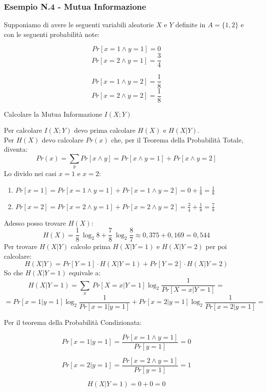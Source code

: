 \newpage

\subsubsection{Esempio N.4 - Mutua Informazione}
Supponiamo di avere le seguenti variabili aleatorie $X$ e $Y$ definite in $A=\{1, 2\}$ e con le seguenti probabilità note:\\
\begin{minipage}{0.50\textwidth}
	\begin{center}
		$$
		Pr[x=1 \wedge y=1] = 0
		$$
		$$
		Pr[x=2 \wedge y=1] = \frac{3}{4}
		$$
	\end{center}
\end{minipage}
\begin{minipage}{0.50\textwidth}
	\begin{center}
		$$
		Pr[x=1 \wedge y=2] = \frac{1}{8}
		$$
		$$
		Pr[x=2 \wedge y=2] = \frac{1}{8}
		$$
	\end{center}
\end{minipage}

Calcolare la Mutua Informazione $I(X;Y)$

Per calcolare $I(X;Y)$ devo prima calcolare $H(X)$ e $H(X|Y)$.\\ Per $H(X)$ devo calcolare $Pr(x)$ che, per il Teorema della Probabilità Totale, diventa:
$$
Pr(x) = \sum_{y} Pr[x \wedge y] = Pr[x \wedge y=1] + Pr[x \wedge y=2]
$$
Lo divido nei casi $x=1$ e $x=2$:
\begin{enumerate}
	\item $Pr[x=1] = Pr[x=1 \wedge y=1] + Pr[x=1 \wedge y=2] = 0 + \frac{1}{8} = \frac{1}{8}$
	\item $Pr[x=2] = Pr[x=2 \wedge y=1] + Pr[x=2 \wedge y=2] = 
	\frac{3}{4} + \frac{1}{8} = \frac{7}{8}$
\end{enumerate}

Adesso posso trovare $H(X)$:
$$
H(X) = \frac{1}{8}\ \log_{2}8 + \frac{7}{8}\ \log_{2} \frac{8}{7} \approx 0,375 + 0,169 = 0,544
$$
Per trovare $H(X|Y)$ calcolo prima $H(X|Y=1)$ e $H(X|Y=2)$ per poi calcolare:
$$
H(X|Y) = Pr[Y=1]\cdot H(X|Y=1) + Pr[Y=2]\cdot H(X|Y=2)
$$
So che $H(X|Y=1)$ equivale a:
$$
H(X|Y=1) = \sum_{x}\ Pr[X=x|Y=1] \log_{2} \frac{1}{Pr[X=x|Y=1]} = 
$$
$$
= Pr[x=1|y=1] \log_{2} \frac{1}{Pr[x=1|y=1]} + Pr[x=2|y=1] \log_{2} \frac{1}{Pr[x=2|y=1]} =
$$

Per il teorema della Probabilità Condizionata:\\
\begin{minipage}{0.50\textwidth}
	\begin{center}
		$$
		Pr[x=1|y=1] = \frac{Pr[x=1 \wedge y=1]}{Pr[y=1]} = 0
		$$
	\end{center}
\end{minipage}
\begin{minipage}{0.50\textwidth}
	\begin{center}
		$$
		Pr[x=2|y=1] = \frac{Pr[x=2 \wedge y=1]}{Pr[y=1]} = 1
		$$
	\end{center}
\end{minipage}
$$
H(X|Y=1) =  0 + 0 = 0
$$

